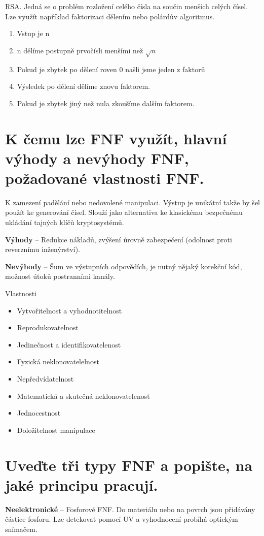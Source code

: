 RSA. Jedná se o problém rozložení celého čísla na součin menších celých čísel. Lze využít například faktorizaci dělením nebo polárdův algoritmus.

\begin{enumerate}
    \item Vstup je n
    \item n dělíme postupně prvočísli menšími než $\sqrt{n}$
    \item Pokud je zbytek po dělení roven 0 našli jsme jeden z faktorů
    \item Výsledek po dělení dělíme znovu faktorem.
    \item Pokud je zbytek jiný než nula zkoušíme dalším faktorem.
\end{enumerate}

\section{K čemu lze FNF využít, hlavní výhody a nevýhody FNF, požadované vlastnosti FNF.}

K zamezení padělání nebo nedovolené manipulaci. Výstup je unikátní takže by šel použít ke generování čísel. Slouží jako alternativa ke klasickému bezpečnému ukládání tajných klíčů kryptosystémů.

\textbf{Výhody} -- Redukce nákladů, zvýšení úrovně zabezpečení (odolnost proti reverznímu inženýrství).

\textbf{Nevýhody} -- Šum ve výstupních odpovědích, je nutný nějaký korekční kód, možnost útoků postranními kanály.

Vlastnosti
\begin{itemize}
    \item Vytvořitelnost a vyhodnotitelnost
    \item Reprodukovatelnost
    \item Jedinečnost a identifikovatelenost
    \item Fyzická neklonovatelelnost
    \item Nepředvídatelnost
    \item Matematická a skutečná neklonovatelenost
    \item Jednocestnost
    \item Doložitelnost manipulace
\end{itemize}

\section{Uveďte tři typy FNF a popište, na jaké principu pracují.}
\textbf{Neelektronické} -- Fosforové FNF. Do materiálu nebo na povrch jsou přidávány částice fosforu. Lze detekovat pomocí UV a vyhodnocení probíhá optickým snímačem.

